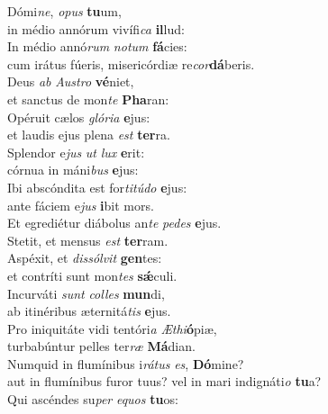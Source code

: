 \evenverse Dómi\textit{ne}, \textit{o}\textit{pus} \textbf{tu}um,~\*\\
\evenverse in médio annórum vivífi\textit{ca} \textbf{il}lud:\\
\oddverse In médio annó\textit{rum} \textit{no}\textit{tum} \textbf{fá}cies:~\*\\
\oddverse cum irátus fúeris, misericórdiæ re\textit{cor}\textbf{dá}beris.\\
\evenverse Deus \textit{ab} \textit{Au}\textit{stro} \textbf{vé}niet,~\*\\
\evenverse et sanctus de mon\textit{te} \textbf{Pha}ran:\\
\oddverse Opéruit cælos \textit{gló}\textit{ri}\textit{a} \textbf{e}jus:~\*\\
\oddverse et laudis ejus plena \textit{est} \textbf{ter}ra.\\
\evenverse Splendor e\textit{jus} \textit{ut} \textit{lux} \textbf{e}rit:~\*\\
\evenverse córnua in máni\textit{bus} \textbf{e}jus:\\
\oddverse Ibi abscóndita est for\textit{ti}\textit{tú}\textit{do} \textbf{e}jus:~\*\\
\oddverse ante fáciem e\textit{jus} \textbf{i}bit mors.\\
\evenverse Et egrediétur diábolus an\textit{te} \textit{pe}\textit{des} \textbf{e}jus.~\*\\
\evenverse Stetit, et mensus \textit{est} \textbf{ter}ram.\\
\oddverse Aspéxit, et \textit{dis}\textit{sól}\textit{vit} \textbf{gen}tes:~\*\\
\oddverse et contríti sunt mon\textit{tes} \textbf{sǽ}culi.\\
\evenverse Incurváti \textit{sunt} \textit{col}\textit{les} \textbf{mun}di,~\*\\
\evenverse ab itinéribus æternitá\textit{tis} \textbf{e}jus.\\
\oddverse Pro iniquitáte vidi tentóri\textit{a} \textit{Æ}\textit{thi}\textbf{ó}piæ,~\*\\
\oddverse turbabúntur pelles ter\textit{ræ} \textbf{Má}dian.\\
\evenverse Numquid in flumínibus i\textit{rá}\textit{tus} \textit{es}, \textbf{Dó}mine?~\*\\
\evenverse aut in flumínibus furor tuus? vel in mari indignáti\textit{o} \textbf{tu}a?\\
\oddverse Qui ascéndes su\textit{per} \textit{e}\textit{quos} \textbf{tu}os:~\*\\
